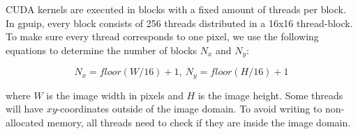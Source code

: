 CUDA kernels are executed in blocks with a fixed amount of threads per block. In gpuip, every block consists of 256 threads distributed in a 16x16 thread-block. To make sure every thread corresponds to one pixel, we use the following equations to determine the number of blocks $N_x$ and $N_y$:

\begin{equation}
N_x = floor(W/16) + 1 ,\ 
N_y = floor(H/16) + 1
\end{equation}

where $W$ is the image width in pixels and $H$ is the image height. Some threads will have $xy$-coordinates outside of the image domain. To avoid writing to non-allocated memory, all threads need to check if they are inside the image domain.



